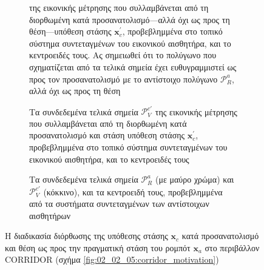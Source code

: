 \begin{figure}
\begin{subfigure}[t]{0.475\linewidth}
{                  της εικονικής μέτρησης που συλλαμβάνεται από τη διορθωμένη
                  κατά προσανατολισμό---αλλά όχι ως προς τη θέση---υπόθεση
                  στάσης $\bm{x}_c^\prime$, προβεβλημμένα στο τοπικό σύστημα
                  συντεταγμένων του εικονικού αισθητήρα, και το κεντροειδές
                  τους. Ας σημειωθεί ότι το πολύγωνο που σχηματίζεται από τα
                  τελικά σημεία έχει ευθυγραμμιστεί ως προς τον προσανατολισμό
                  με το αντίστοιχο πολύγωνο $\mathcal{P}_R^a$, αλλά όχι ως προς
                  τη θέση}
    \end{subfigure}
    \begin{subfigure}[t]{0.475\linewidth} \centering
        \hspace{0.5cm}
        \vspace{1em}
        \caption{\small Τα συνδεδεμένα τελικά σημεία $\mathcal{P}_V^{c\prime}$ της
                  εικονικής μέτρησης που συλλαμβάνεται από τη διορθωμένη
                  κατά προσανατολισμό και στάση υπόθεση στάσης
                  $\bm{x}_c^\prime$, προβεβλημμένα στο τοπικό σύστημα
                  συντεταγμένων του εικονικού αισθητήρα, και το κεντροειδές
                  τους}
    \end{subfigure}
    \hfill
    \begin{subfigure}[t]{0.475\linewidth} \centering
        \hspace{0.5cm}
        \vspace{1em}
        \caption{\small Τα συνδεδεμένα τελικά σημεία $\mathcal{P}_R^a$ (με
                 μαύρο χρώμα) και $\mathcal{P}_V^{c\prime}$ (κόκκινο), και τα
                 κεντροειδή τους, προβεβλημμένα από τα συστήματα συντεταγμένων
                 των αντίστοιχων αισθητήρων}
    \end{subfigure}
    \caption{\small Η διαδικασία διόρθωσης της υπόθεσης στάσης $\bm{x}_c$
             κατά προσανατολισμό και θέση ως προς την πραγματική στάση του
             ρομπότ $\bm{x}_a$ στο περιβάλλον CORRIDOR (σχήμα
             \ref{fig:02_02_05:corridor_motivation})}
    \label{fig:pgl_fmic_illustration}
\end{figure}

